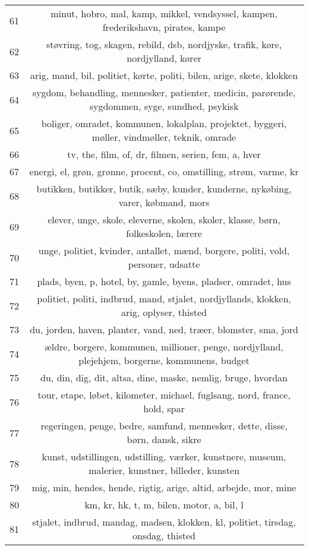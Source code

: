 \begin{longtable}[c]{c | c}
		61 & minut, hobro, mal, kamp, mikkel, vendsyssel, kampen, frederikshavn, pirates, kampe \\
		62 & støvring, tog, skagen, rebild, dsb, nordjyske, trafik, køre, nordjylland, kører \\
		63 & arig, mand, bil, politiet, kørte, politi, bilen, arige, skete, klokken \\
		64 & sygdom, behandling, mennesker, patienter, medicin, parørende, sygdommen, syge, sundhed, psykisk \\
		65 & boliger, omradet, kommunen, lokalplan, projektet, byggeri, møller, vindmøller, teknik, omrade \\
		66 & tv, the, film, of, dr, filmen, serien, fem, a, hver \\
		67 & energi, el, grøn, grønne, procent, co, omstilling, strøm, varme, kr \\
		68 & butikken, butikker, butik, sæby, kunder, kunderne, nykøbing, varer, købmand, mors \\
		69 & elever, unge, skole, eleverne, skolen, skoler, klasse, børn, folkeskolen, lærere \\
		70 & unge, politiet, kvinder, antallet, mænd, borgere, politi, vold, personer, udsatte \\
		71 & plads, byen, p, hotel, by, gamle, byens, pladser, omradet, hus \\
		72 & politiet, politi, indbrud, mand, stjalet, nordjyllands, klokken, arig, oplyser, thisted \\
		73 & du, jorden, haven, planter, vand, ned, træer, blomster, sma, jord \\
		74 & ældre, borgere, kommunen, millioner, penge, nordjylland, plejehjem, borgerne, kommunens, budget \\
		75 & du, din, dig, dit, altsa, dine, maske, nemlig, bruge, hvordan \\
		76 & tour, etape, løbet, kilometer, michael, fuglsang, nord, france, hold, spar \\
		77 & regeringen, penge, bedre, samfund, mennesker, dette, disse, børn, dansk, sikre \\
		78 & kunst, udstillingen, udstilling, værker, kunstnere, museum, malerier, kunstner, billeder, kunsten \\
		79 & mig, min, hendes, hende, rigtig, arige, altid, arbejde, mor, mine \\
		80 & km, kr, hk, t, m, bilen, motor, a, bil, l \\
		81 & stjalet, indbrud, mandag, madsen, klokken, kl, politiet, tirsdag, onsdag, thisted \\

\end{longtable}
